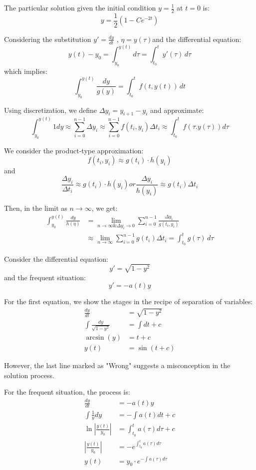 \documentclass[11pt]{article}
\begin{document}
The particular solution given the initial condition \( y = \frac{1}{2} \) at \( t = 0 \) is:
\[ y = \frac{1}{2}(1 - C e^{-2t}) \]



Considering the substitution \( y' = \frac{dy}{dt} \) , \(\eta = y(\tau)\)and the differential equation:
\[ y(t) - y_0 =\int_{y_0}^{y(t)}d\tau = \int_{t_0}^{t} y'(\tau) \, d\tau \]
which implies:
\[ \int_{y_0}^{y(t)} \frac{dy}{g(y)} = \int_{t_0}^{t} f(t,y(t)) \, dt \]

Using discretization, we define \( \Delta y_i = y_{i+1} - y_i \) and approximate:
\[ \int_{y_0}^{y(t)} 1dy \approx \sum_{i=0}^{n-1} \Delta y_i \approx \sum_{i=0}^{n-1} f(t_i,y_i) \Delta t_i \approx 
\int_{t_0}^{t} f (\tau. y(\tau))d\tau\]


We consider the product-type approximation:
\[ f(t_i,y_i) \approx g(t_i) \cdot h(y_i) \]
and
\[ \frac{\Delta y_i}{\Delta t_i} \approx g(t_i) \cdot h(y_i) or \frac{\Delta y_i}{h(y_i)} \approx g(t_i) \Delta t_i\]

Then, in the limit as \( n \rightarrow \infty \), we get:
\begin{align*}
\int_{y_0}^{y(t)} \frac{dy}{h(\eta)} &= \lim_{n \rightarrow \infty \& \Delta y_i \rightarrow 0} \sum_{i=0}^{n-1} \frac{\Delta y_i}{g(t_i,y_i)} \\
&\approx \lim_{n \rightarrow \infty} \sum_{i=0}^{n-1} g(t_i) \Delta t_i = \int_{t_0}^{t} g(\tau) \, d\tau
\end{align*}




Consider the differential equation:
\[ y' = \sqrt{1 - y^2} \]
and the frequent situation:
\[ y' = -a(t)y \]

For the first equation, we show the stages in the recipe of separation of variables:
\begin{align*}
\frac{dy}{dt} &= \sqrt{1 - y^2} \\
\int \frac{dy}{\sqrt{1 - y^2}} &= \int dt + c \\
\arcsin(y) &= t + c \\
y(t) &= \sin(t + c)
\end{align*}

However, the last line marked as "Wrong" suggests a misconception in the solution process.

For the frequent situation, the process is:
\begin{align*}
\frac{dy}{dt} &= -a(t)y \\
\int \frac{1}{y} dy &= -\int a(t) dt + c \\
\ln |\frac{y(t)}{y_0}| &=  \int_{t_0}^{t} a(\tau) d\tau + c \\
|\frac{y(t)}{y_0}| &= - e^{\int_{t_0}^{t} a(\tau) d\tau}\\
y(t) &= y_0\cdot e^{-\int a(\tau) d\tau}
\end{align*}
\end{document}
